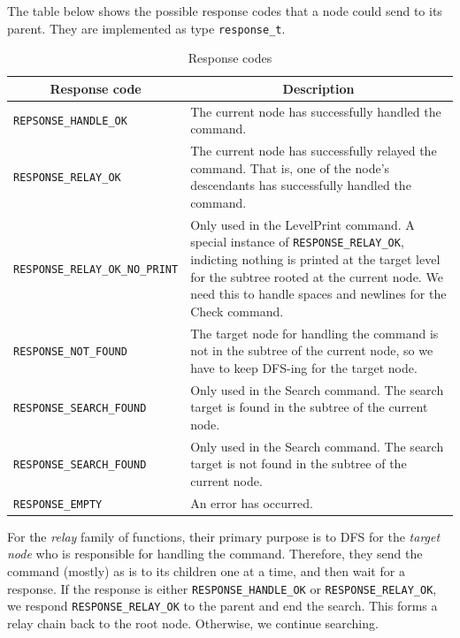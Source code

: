 \documentclass[12pt, a4paper]{article}
\begin{document}
  The table below shows the possible response codes that a node could send to
  its parent. They are implemented as type \verb|response_t|.
  \begin{table}[H]
    \centering
    \caption{Response codes}
    \begin{tabularx}{\linewidth}{|l|X|}
      \hline
      \multicolumn{1}{|c|}{\textbf{Response code}} &
      \multicolumn{1}{c|}{\textbf{Description}}
      \\\hline
      \verb|REPSONSE_HANDLE_OK| &
      The current node has successfully handled the command.
      \\\hline
      \verb|RESPONSE_RELAY_OK| &
      The current node has successfully relayed the command. That is, one of the
      node's descendants has successfully handled the command.
      \\\hline
      \verb|RESPONSE_RELAY_OK_NO_PRINT| &
      Only used in the LevelPrint command. A special instance of
      \verb|RESPONSE_RELAY_OK|, indicting nothing is printed at the target level
      for the subtree rooted at the current node.
      We need this to handle spaces and newlines for the Check command.
      \\\hline
      \verb|RESPONSE_NOT_FOUND| &
      The target node for handling the command is not in the subtree of the
      current node, so we have to keep DFS-ing for the target node.
      \\\hline
      \verb|RESPONSE_SEARCH_FOUND| &
      Only used in the Search command. The search target is found in the subtree of
      the current node.
      \\\hline
      \verb|RESPONSE_SEARCH_FOUND| &
      Only used in the Search command. The search target is not found in the subtree of
      the current node.
      \\\hline
      \verb|RESPONSE_EMPTY| &
      An error has occurred.
      \\\hline
      \end{tabularx}
  \end{table}

  For the \textit{relay} family of functions, their primary purpose is to
  DFS for the \textit{target node} who is responsible for handling the command.
  Therefore, they send the command (mostly) as is to its children one at a time,
  and then wait for a response.
  If the response is either \verb|RESPONSE_HANDLE_OK| or \verb|RESPONSE_RELAY_OK|,
  we respond \verb|RESPONSE_RELAY_OK| to the parent and end the search. This
  forms a relay chain back to the root node. Otherwise, we continue searching.
\end{document}
